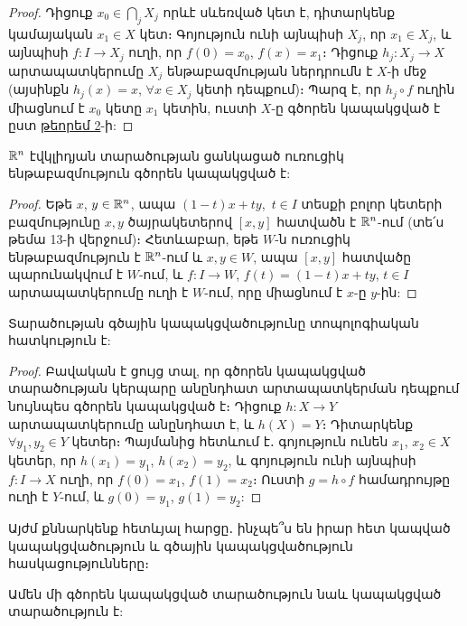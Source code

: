 \documentclass[./main.tex]{subfiles}
\begin{document}
\begin{proof}
Դիցուք $x_0\in \bigcap\limits_j X_j$ որևէ սևեռված կետ է, դիտարկենք կամայա\-կան $x_1\in X$ կետ։ Գոյություն ունի այնպիսի $X_j$, որ $x_1\in X_j$, և այնպիսի ${f :I \rightarrow X_j}$ ուղի, որ $f(0)=x_0$, $f(x)=x_1$։ Դիցուք $h_j :X_j \rightarrow X$ արտապատկերումը $X_j$ ենթա\-բազմության ներդրումն է $X$-ի մեջ (այսինքն $h_j (x)=x$, $\forall x\in X_j$ կետի դեպ\-քում)։ Պարզ է, որ $h_j\circ f$ ուղին միացնում է $x_0$ կետը $x_1$ կետին, ուստի $X$-ը գծորեն կապակցված է ըստ \hyperref[ch15thm2]{թեորեմ 2}-ի:
\end{proof}

\begin{theorem}\label{ch15thm4}   
$\mathbb{R}^n$ էվկլիդյան տարածության ցանկացած ուռուցիկ ենթաբազմութ\-յուն գծորեն կապակցված է:
\end{theorem}

\begin{proof}
Եթե $x$, $y \in \mathbb{R}^n$, ապա $(1-t)x+ty$,\, $t \in I$ տեսքի բոլոր կետերի բազմությունը $x,y$ ծայրակետերով $[x,y]$ հատվածն է $\mathbb{R}^n$-ում (տե՛ս թեմա 13-ի վեր\-ջում)։ Հետևաբար, եթե $W$-ն ուռուցիկ ենթաբազմություն է $\mathbb{R}^n$-ում և $x,y \in W$, ապա $[x,y]$ հատվածը պարունակվում է $W$-ում, և $f :I \rightarrow W$, $f(t)=(1-t)x+ty$, $t \in I$ արտապատկերումը ուղի է $W$-ում, որը միացնում է $x$-ը $y$-ին:
\end{proof}

\begin{theorem}\label{ch15thm5} %
Տարածության գծային կապակցվածությունը տոպոլոգիական հատ\-կութ\-յուն է:
\end{theorem}

\begin{proof}
Բավական է ցույց տալ, որ գծորեն կապակցված տարածության կերպարը անընդհատ արտապատկերման դեպքում նույնպես գծորեն կապակցված է։ Դիցուք $h :X\rightarrow Y$ արտապատկերումը անընդհատ է, և $h(X)=Y$։ Դիտարկենք $\forall y_1, y_2 \in Y$ կետեր։ Պայմանից հետևում է․ գոյություն ունեն $x_1$, $x_2 \in X$ կետեր, որ $h(x_1)=y_1$, $h(x_2)=y_2$, և գոյություն ունի այնպիսի $f :I\rightarrow X$ ուղի, որ $f(0)=x_1$, $f(1)=x_2$։ Ուստի $g=h\circ f$ համադրույթը ուղի է $Y$-ում, և $g(0)=y_1$, $g(1)=y_2$:
\end{proof}

\par Այժմ քննարկենք հետևյալ հարցը․ ինչպե՞ս են իրար հետ կապված կապակցվա\-ծու\-թյուն և գծային կապակցվածություն հասկացությունները։

\begin{theorem}\label{ch15thm6}
Ամեն մի գծորեն կապակցված տարածություն նաև կապակցված տարածություն է:
\end{theorem}
\end{document}
